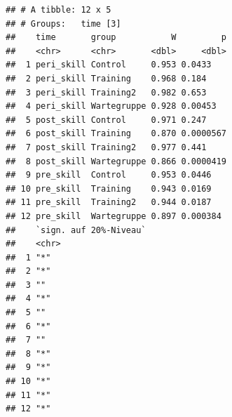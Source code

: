 \documentclass[
]{book}
\newenvironment{Shaded}{\begin{snugshade}}{\end{snugshade}}
\newcommand{\AttributeTok}[1]{\textcolor[rgb]{0.77,0.63,0.00}{#1}}
\newcommand{\DecValTok}[1]{\textcolor[rgb]{0.00,0.00,0.81}{#1}}
\newcommand{\FunctionTok}[1]{\textcolor[rgb]{0.00,0.00,0.00}{#1}}
\newcommand{\NormalTok}[1]{#1}
\newcommand{\OtherTok}[1]{\textcolor[rgb]{0.56,0.35,0.01}{#1}}
\newcommand{\SpecialCharTok}[1]{\textcolor[rgb]{0.00,0.00,0.00}{#1}}
\newcommand{\StringTok}[1]{\textcolor[rgb]{0.31,0.60,0.02}{#1}}
\begin{document}
\begin{Shaded}
\end{Shaded}

\begin{verbatim}
## # A tibble: 12 x 5
## # Groups:   time [3]
##    time       group           W         p
##    <chr>      <chr>       <dbl>     <dbl>
##  1 peri_skill Control     0.953 0.0433   
##  2 peri_skill Training    0.968 0.184    
##  3 peri_skill Training2   0.982 0.653    
##  4 peri_skill Wartegruppe 0.928 0.00453  
##  5 post_skill Control     0.971 0.247    
##  6 post_skill Training    0.870 0.0000567
##  7 post_skill Training2   0.977 0.441    
##  8 post_skill Wartegruppe 0.866 0.0000419
##  9 pre_skill  Control     0.953 0.0446   
## 10 pre_skill  Training    0.943 0.0169   
## 11 pre_skill  Training2   0.944 0.0187   
## 12 pre_skill  Wartegruppe 0.897 0.000384 
##    `sign. auf 20%-Niveau`
##    <chr>                 
##  1 "*"                   
##  2 "*"                   
##  3 ""                    
##  4 "*"                   
##  5 ""                    
##  6 "*"                   
##  7 ""                    
##  8 "*"                   
##  9 "*"                   
## 10 "*"                   
## 11 "*"                   
## 12 "*"
\end{verbatim}
\end{document}
